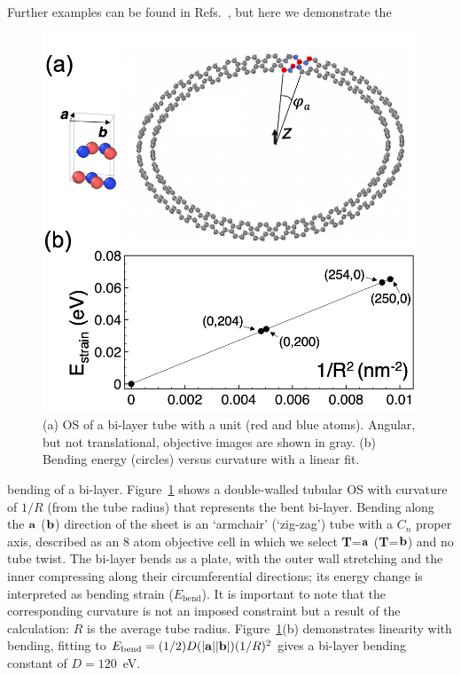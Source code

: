 \documentclass{revtex4-1}
\begin{document}
Further examples can be found in Refs.~, but here we demonstrate the
\begin{figure}[htbp]
  \begin{center}
    \includegraphics[scale=0.4]{Fig2_td.png}
    \caption{\label{fig2_td} (a) OS of a  bi-layer tube with a 
      unit (red and blue atoms). Angular, but not translational, objective
      images are shown in gray. (b) Bending energy (circles)
      versus curvature with a linear fit.}
  \end{center}
\end{figure}
bending of a  bi-layer. Figure~\ref{fig2_td} shows a double-walled
tubular OS with curvature of $1/R$ (from the tube radius) that
represents the bent bi-layer. Bending along the ${\bf a}$ (${\bf b}$) direction of the
sheet is an `armchair' (`zig-zag') tube with a $C_n$ proper axis, described as
an 8 atom objective cell in which we select {\bf T}=${\bf a}$ ({\bf T}=${\bf
  b}$) and no tube twist.  The bi-layer bends as a plate, with the outer wall
stretching and the inner compressing along their circumferential directions; its
energy change is interpreted as bending strain ($E_\text{bend}$). It is important
to note that the corresponding curvature is not an imposed constraint but a
result of the calculation: $R$ is the average tube
radius. Figure~\ref{fig2_td}(b) demonstrates linearity with bending, fitting to
$E_\text{bend}=(1/2)D(|{\bf a}| |{\bf b}|)(1/R)^2$ gives a bi-layer bending
constant of $D=120$~eV.
\end{document}
